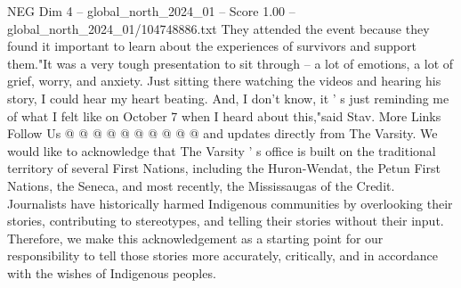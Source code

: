\begin{textsample}{NEG Dim 4 – global\_north\_2024\_01 – Score 1.00 – global\_north\_2024\_01/104748886.txt}
They attended the event because they found it important to learn about the experiences of survivors and support them."It was a very tough presentation to sit through -- a lot of emotions, a lot of grief, worry, and anxiety.
Just sitting there watching the videos and hearing his story, I could hear my heart beating.
And, I don't know, it ' s just reminding me of what I felt like on October 7 when I heard about this,"said Stav.
More Links Follow Us @ @ @ @ @ @ @ @ @ @ and updates directly from The Varsity.
We would like to acknowledge that The Varsity ' s office is built on the traditional territory of several First Nations, including the Huron-Wendat, the Petun First Nations, the Seneca, and most recently, the Mississaugas of the Credit.
Journalists have historically harmed Indigenous communities by overlooking their stories, contributing to stereotypes, and telling their stories without their input.
Therefore, we make this acknowledgement as a starting point for our responsibility to tell those stories more accurately, critically, and in accordance with the wishes of Indigenous peoples.

\end{textsample}
